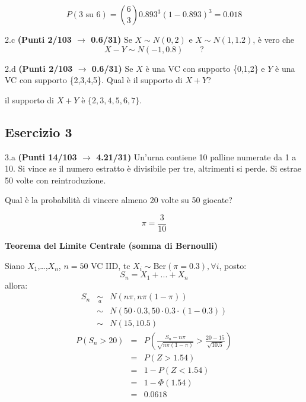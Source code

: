 \documentclass[
  11pt,
]{book}
\theoremstyle{mytheoremstyle}
\theoremstyle{mydefstyle}
\newenvironment{sol}
  {
  \begin{tcolorbox}[enhanced,breakable,arc=0.1mm,boxrule=1pt,colback=white,colframe=iblue,
  title=\bf \fontfamily{lmss}\selectfont \hspace{.5 cm} Soluzione,drop fuzzy shadow]

}{
\end{tcolorbox}
  }
\begin{document}
\begin{sol}
\[
P(\text{3 su 6})=\binom{6}{3}0.893^3(1-0.893)^3=0.018
\]

\end{sol}

2.c \textbf{(Punti 2/103 \(\rightarrow\) 0.6/31)} Se \(X\sim N(0,2)\) e \(X\sim N(1,1.2)\), è vero che
\[
X-Y\sim N(-1,0.8) \qquad ?
\]

2.d \textbf{(Punti 2/103 \(\rightarrow\) 0.6/31)} Se \(X\) è una VC con supporto \{0,1,2\} e \(Y\) è una VC con supporto \{2,3,4,5\}.
Qual è il supporto di \(X+Y\)?

\begin{sol}
il supporto di \(X+Y\) è \(\{2, 3, 4, 5, 6, 7\}\).

\end{sol}

\subsection{Esercizio 3}\label{esercizio-3-14}

3.a \textbf{(Punti 14/103 \(\rightarrow\) 4.21/31)} Un'urna contiene 10 palline numerate da 1 a 10.
Si vince se il numero estratto è divisibile per tre, altrimenti si perde.
Si estrae 50 volte con reintroduzione.

Qual è la probabilità di vincere almeno 20 volte su 50 giocate?

\begin{sol}
\[
\pi=\frac 3{10}
\]

\textbf{Teorema del Limite Centrale (somma di Bernoulli)}

Siano \(X_1\),\ldots,\(X_n\), \(n=50\) VC IID, tc \(X_i\sim\text{Ber}(\pi=0.3)\)\(,\forall i\), posto:
\[
      S_n = X_1 + ... + X_n
      \]
allora:\begin{eqnarray*}
  S_n & \mathop{\sim}\limits_{a}& N(n\pi,n\pi(1-\pi)) \\
      &\sim & N(50\cdot0.3,50\cdot0.3\cdot(1-0.3)) \\
      &\sim & N(15,10.5)
  \end{eqnarray*}\begin{eqnarray*}
      P( S_n   >   20 ) 
        &=& P\left(  \frac { S_n  -  n\pi }{ \sqrt{n\pi(1-\pi)} }  >  \frac { 20  -  15 }{\sqrt{ 10.5 }} \right)  \\
                 &=& P\left(  Z   >   1.54 \right) \\    &=& 1-P(Z< 1.54 )\\ 
                 &=&  1-\Phi( 1.54 ) \\ &=&  0.0618 
      \end{eqnarray*}

\end{sol}
\end{document}
